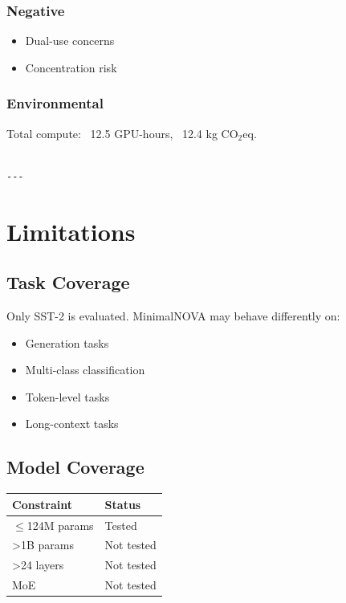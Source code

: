 \subsubsection{Negative}
\begin{itemize}
\item Dual-use concerns
\item Concentration risk

\end{itemize}
\subsubsection{Environmental}
Total compute: ~12.5 GPU-hours, ~12.4 kg CO$_2$eq.
\begin{lstlisting}

---
\end{lstlisting}


\section{Limitations}

\subsection{Task Coverage}

Only SST-2 is evaluated. MinimalNOVA may behave differently on:
\begin{itemize}
\item Generation tasks
\item Multi-class classification
\item Token-level tasks
\item Long-context tasks

\end{itemize}
\subsection{Model Coverage}

\begin{table}[H]
\centering
\small
\begin{tabular}{ll}
\toprule
\textbf{Constraint} & \textbf{Status} \\
\midrule
$\le$124M params & Tested \\
\textgreater{}1B params & Not tested \\
\textgreater{}24 layers & Not tested \\
MoE & Not tested \\
\bottomrule
\end{tabular}
\end{table}

